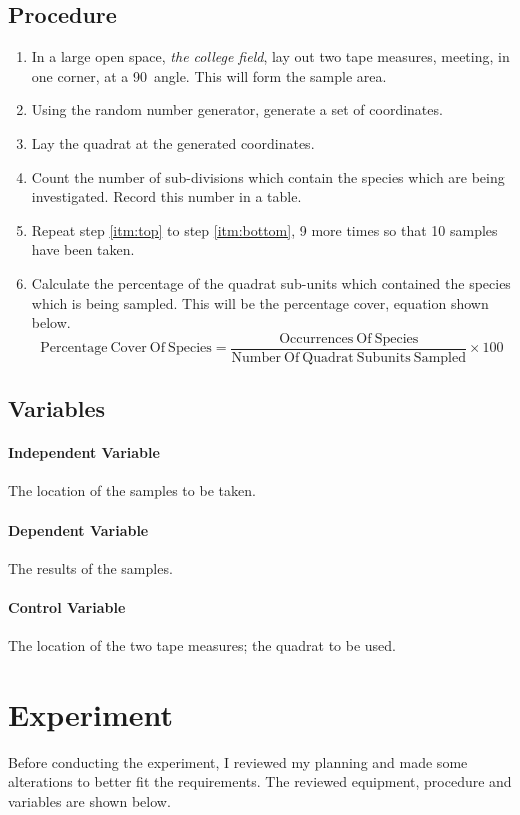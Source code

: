 \documentclass{thomasClass}
\begin{document}
\subsection{Procedure}
\begin{enumerate}
    \item In a large open space, \textit{the college field}, lay out two tape measures, meeting, in one corner, at a 90\textdegree \ angle. This will form the sample area.
    \item \label{itm:top} Using the random number generator, generate a set of coordinates.
    \item Lay the quadrat at the generated coordinates. 
    \item Count the number of sub-divisions which contain the species which are being investigated. Record this number in a table.
    \item \label{itm:bottom} Repeat step \ref{itm:top} to step \ref{itm:bottom}, 9 more times so that 10 samples have been taken. 
    \item Calculate the percentage of the quadrat sub-units which contained the species which is being sampled. This will be the percentage cover, equation shown below.\\
    \begin{equation*}
    \mathrm{Percentage\ Cover\ Of\ Species} = \frac{\mathrm{Occurrences\ Of\ Species}}{\mathrm{Number\ Of\ Quadrat\ Sub units\ Sampled}} \times 100
    \end{equation*}
\end{enumerate}
\subsection{Variables}
\paragraph{Independent Variable}
The location of the samples to be taken.
\paragraph{Dependent Variable}
The results of the samples.
\paragraph{Control Variable}
The location of the two tape measures; the quadrat to be used.

\section{Experiment}
Before conducting the experiment, I reviewed my planning and made some alterations to better fit the requirements. The reviewed equipment, procedure and variables are shown below.
\end{document}
